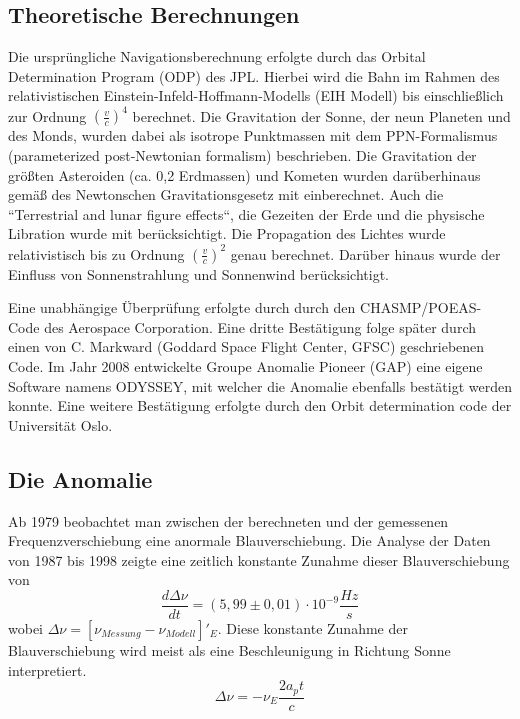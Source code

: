 \documentclass[a4paper,10pt]{article}
\newcommand{\rem}[1]{}
\begin{document}
\subsection{Theoretische Berechnungen}
Die ursprüngliche Navigationsberechnung erfolgte durch das Orbital Determination Program (ODP) des JPL.
Hierbei wird die Bahn im Rahmen des relativistischen Einstein-Infeld-Hoffmann-Modells (EIH Modell)
bis einschließlich zur Ordnung $(\frac{v}{c})^4$ berechnet.
Die Gravitation der Sonne, der neun Planeten und des Monds, wurden dabei als isotrope Punktmassen mit dem
PPN-Formalismus (parameterized post-Newtonian formalism) beschrieben\cite{Anderson2002}. Die Gravitation der größten
Asteroiden (ca. 0,2
Erdmassen) und Kometen wurden darüberhinaus gemäß des Newtonschen Gravitationsgesetz mit einberechnet. Auch die
``Terrestrial and lunar figure effects``, die Gezeiten der Erde und die physische Libration wurde mit berücksichtigt.
Die Propagation des Lichtes wurde relativistisch bis zu Ordnung $(\frac{v}{c})^2$ genau berechnet.
Darüber hinaus wurde der Einfluss von Sonnenstrahlung und Sonnenwind berücksichtigt.

Eine unabhängige Überprüfung erfolgte durch durch den CHASMP/POEAS-Code des Aerospace Corporation.
Eine dritte Bestätigung folge später durch einen von C. Markward (Goddard Space Flight Center, GFSC) geschriebenen Code.
Im Jahr 2008 entwickelte Groupe Anomalie Pioneer (GAP) eine eigene Software namens ODYSSEY,
mit welcher die Anomalie ebenfalls bestätigt werden konnte.
Eine weitere Bestätigung erfolgte durch den Orbit determination code der Universität Oslo.

\rem{
 Wohin mit ''Model of observation stations``?
}

\subsection{Die Anomalie}
Ab 1979 beobachtet man zwischen der berechneten und der gemessenen Frequenzverschiebung eine anormale Blauverschiebung.
Die Analyse der Daten von 1987 bis 1998 zeigte eine zeitlich konstante Zunahme dieser Blauverschiebung von
\begin{equation}
  \frac{d\Delta\nu}{dt}=(5,99\pm0,01)\cdot10^{-9}\frac{Hz}{s}
\end{equation}
wobei $\Delta\nu=[\nu_{Messung}-\nu_{Modell}]'_E$. Diese konstante Zunahme der Blauverschiebung wird meist als eine
Beschleunigung in Richtung Sonne interpretiert.
\begin{equation}
  \Delta\nu=-\nu_E \frac{2a_p t}{c}
\end{equation}




{}

\end{document}
